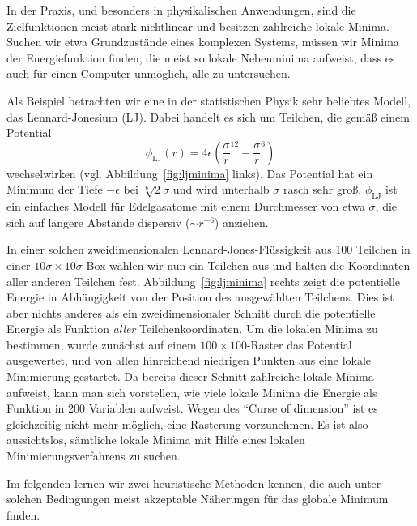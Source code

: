 In der Praxis, und besonders in physikalischen Anwendungen, sind die
Zielfunktionen meist stark nichtlinear und besitzen zahlreiche lokale
Minima. Suchen wir etwa Grundzustände eines komplexen Systems, müssen
wir Minima der Energiefunktion finden, die meist so lokale Nebenminima
aufweist, dass es auch für einen Computer unmöglich, alle zu
untersuchen.

Als Beispiel betrachten wir eine in der statistischen Physik sehr
beliebtes Modell, das Lennard-Jonesium (LJ). Dabei handelt es sich um
Teilchen, die gemäß einem Potential
\begin{equation}
  \phi_{\text{LJ}}(r) = 4\epsilon\left(\frac{\sigma}{r}^{12} -
    \frac{\sigma}{r}^{6}\right)
\end{equation}
wechselwirken (vgl. Abbildung~\ref{fig:ljminima} links). Das Potential
hat ein Minimum der Tiefe $-\epsilon$ bei $\sqrt[6]{2}\sigma$ und wird
unterhalb $\sigma$ rasch sehr groß. $\phi_{\text{LJ}}$ ist ein
einfaches Modell für Edelgasatome mit einem Durchmesser von etwa
$\sigma$, die sich auf längere Abstände dispersiv ($\sim r^{-6}$)
anziehen.

In einer solchen zweidimensionalen Lennard-Jones-Flüssigkeit aus 100
Teilchen in einer $10\sigma\times 10\sigma$-Box wählen wir nun ein
Teilchen aus und halten die Koordinaten aller anderen Teilchen
fest. Abbildung~\ref{fig:ljminima} rechts zeigt die potentielle
Energie in Abhängigkeit von der Position des ausgewählten
Teilchens. Dies ist aber nichts anderes als ein zweidimensionaler
Schnitt durch die potentielle Energie als Funktion \emph{aller}
Teilchenkoordinaten. Um die lokalen Minima zu bestimmen, wurde
zunächst auf einem $100\times 100$-Raster das Potential ausgewertet,
und von allen hinreichend niedrigen Punkten aus eine lokale
Minimierung gestartet. Da bereits dieser Schnitt zahlreiche lokale
Minima aufweist, kann man sich vorstellen, wie viele lokale Minima die
Energie als Funktion in 200 Variablen aufweist.  Wegen des ``Curse of
dimension'' ist es gleichzeitig nicht mehr möglich, eine Rasterung
vorzunehmen. Es ist also aussichtslos, sämtliche lokale Minima mit
Hilfe eines lokalen Minimierungsverfahrens zu suchen.

Im folgenden lernen wir zwei heuristische Methoden kennen, die auch
unter solchen Bedingungen meist akzeptable Näherungen für das globale
Minimum finden.

\subsection{}

